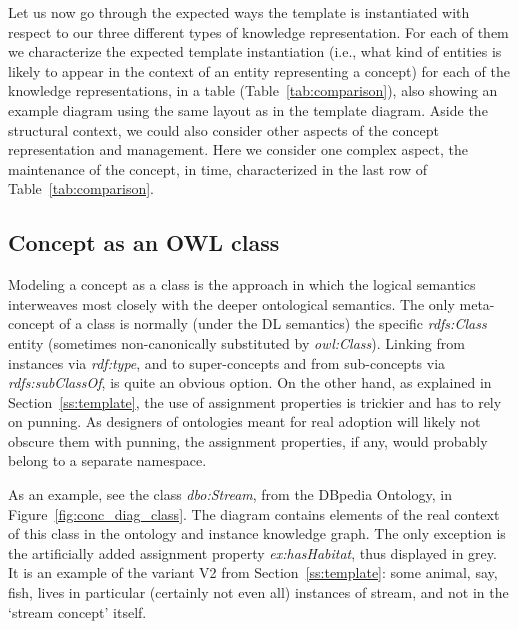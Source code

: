 Let us now go through the expected ways the template is instantiated with respect to our three different types of knowledge representation.
For each of them we characterize the expected template instantiation (i.e., what kind of entities is likely to appear in the context of an entity representing a concept) for each of the knowledge representations, in a table (Table~\ref{tab:comparison}), also showing an example diagram using the same layout as in the template diagram. 
Aside the structural context, we could also consider other aspects of the concept representation and management. 
Here we consider one complex aspect, the maintenance of the concept, in time, characterized in the last row of Table~\ref{tab:comparison}.



\subsection{Concept as an OWL class}

Modeling a concept as a class is the approach in which the logical semantics interweaves most closely with the deeper ontological semantics.
The only meta-concept of a class is normally (under the DL semantics) the specific \emph{rdfs:Class} entity (sometimes non-canonically substituted by \emph{owl:Class}).
Linking from instances via \emph{rdf:type}, and to super-concepts and from sub-concepts via \emph{rdfs:subClassOf}, is quite an obvious option.
On the other hand, as explained in Section~\ref{ss:template}, the use of assignment properties is trickier and has to rely on punning.
As designers of ontologies meant for real adoption will likely not obscure them with punning, the assignment properties, if any, would probably belong to a separate namespace. 

As an example, see the class \emph{dbo:Stream}, from the DBpedia Ontology, in Figure~\ref{fig:conc_diag_class}. 
The diagram contains elements of the real context of this class in the ontology and instance knowledge graph.
The only exception is the artificially added assignment property \emph{ex:hasHabitat}, thus displayed in grey.
It is an example of the variant V2 from Section~\ref{ss:template}: some animal, say, fish, lives in particular (certainly not even all) instances of stream, and not in the `stream concept' itself.


